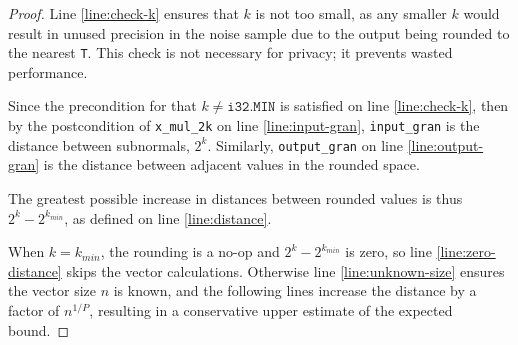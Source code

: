 \documentclass{article}
\begin{document}
\begin{proof}
    Line \ref{line:check-k} ensures that $k$ is not too small, 
    as any smaller $k$ would result in unused precision in the noise sample 
    due to the output being rounded to the nearest \texttt{T}.
    This check is not necessary for privacy; it prevents wasted performance.

    Since the precondition for  that $k \neq \texttt{i32.MIN}$ is satisfied on line \ref{line:check-k},
    then by the postcondition of \texttt{x\_mul\_2k} on line \ref{line:input-gran},
    \texttt{input\_gran} is the distance between subnormals, $2^k$.
    Similarly, \texttt{output\_gran} on line \ref{line:output-gran} is the distance between adjacent values in the rounded space.

    The greatest possible increase in distances between rounded values is thus $2^{k} - 2^{k_{min}}$,
    as defined on line \ref{line:distance}.
    
    When $k = k_{min}$, the rounding is a no-op and $2^k - 2^{k_{min}}$ is zero, 
    so line \ref{line:zero-distance} skips the vector calculations.
    Otherwise line \ref{line:unknown-size} ensures the vector size $n$ is known,
    and the following lines increase the distance by a factor of $n^{1/P}$,
    resulting in a conservative upper estimate of the expected bound.
\end{proof}
\end{document}
